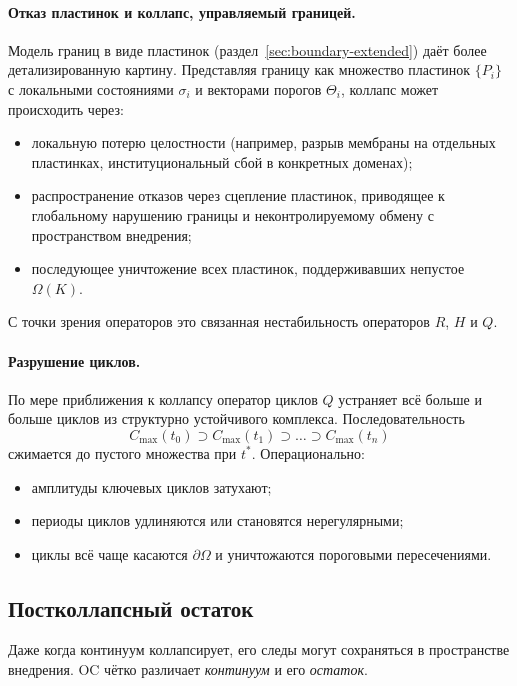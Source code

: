 \paragraph{Отказ пластинок и коллапс, управляемый границей.}
Модель границ в виде пластинок
(раздел~\ref{sec:boundary-extended}) даёт более детализированную картину.
Представляя границу как множество пластинок \(\{P_i\}\) с локальными
состояниями \(\sigma_i\) и векторами порогов \(\Theta_i\), коллапс может
происходить через:
\begin{itemize}
  \item локальную потерю целостности (например, разрыв мембраны на отдельных
        пластинках, институциональный сбой в конкретных доменах);
  \item распространение отказов через сцепление пластинок, приводящее к
        глобальному нарушению границы и неконтролируемому обмену с пространством
        внедрения;
  \item последующее уничтожение всех пластинок, поддерживавших непустое
        \(\Omega(K)\).
\end{itemize}
С точки зрения операторов это связанная нестабильность операторов \(R\),
\(H\) и \(Q\).

\paragraph{Разрушение циклов.}
По мере приближения к коллапсу оператор циклов \(Q\) устраняет всё больше и
больше циклов из структурно устойчивого комплекса. Последовательность
\[
  C_{\max}(t_0)
  \supset C_{\max}(t_1)
  \supset \dots
  \supset C_{\max}(t_n)
\]
сжимается до пустого множества при \(t^{\ast}\). Операционально:
\begin{itemize}
  \item амплитуды ключевых циклов затухают;
  \item периоды циклов удлиняются или становятся нерегулярными;
  \item циклы всё чаще касаются \(\partial\Omega\) и уничтожаются пороговыми
        пересечениями.
\end{itemize}

\subsection{Постколлапсный остаток}

Даже когда континуум коллапсирует, его следы могут сохраняться в пространстве
внедрения. OC чётко различает \emph{континуум} и его \emph{остаток}.

